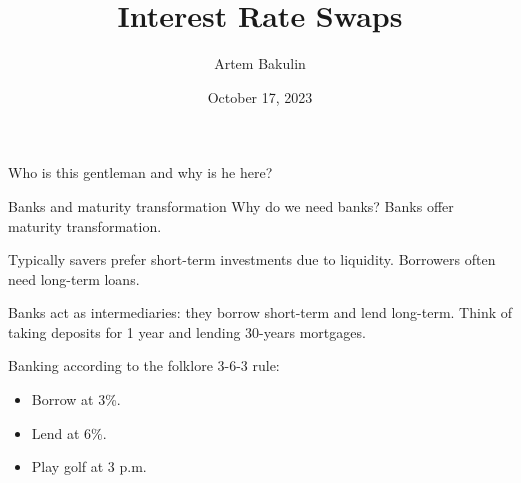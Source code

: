 \documentclass{beamer}
\title{Interest Rate Swaps}
\author{Artem Bakulin}
\date{October 17, 2023}
\begin{document}
\begin{frame}
\titlepage
\end{frame}



\begin{frame}{Who is this gentleman and why is he here?}
\centering
{}
\end{frame}



\begin{frame}{Banks and maturity transformation}
\justify
Why do we need banks? Banks offer \alert{maturity transformation}.

\justify
Typically savers prefer short-term investments due to liquidity.  Borrowers often need long-term loans.

\justify
Banks act as intermediaries: they borrow short-term and lend long-term. Think of taking deposits for 1 year and lending 30-years mortgages.

\justify
Banking according to the folklore 3-6-3 rule:
\begin{itemize}
\item Borrow at 3\%.
\item Lend at 6\%.
\item Play golf at 3 p.m.
\end{itemize}
\end{frame}
\end{document}
